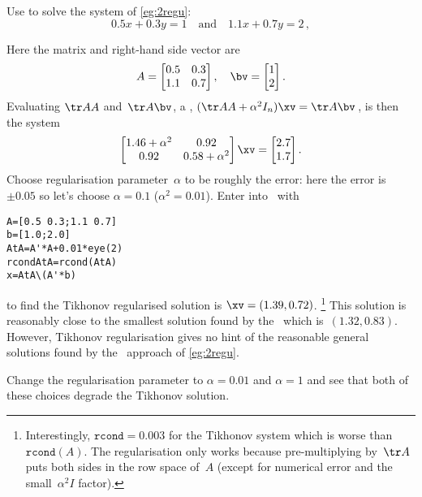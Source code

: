 \begin{example} \label{eg:}
Use  to solve the system of \autoref{eg:2regu}:
\begin{equation*}
0.5x+0.3y=1\quad\text{and}\quad 1.1x+0.7y=2\,,
\end{equation*}
\begin{solution} 
Here the matrix and right-hand side vector are
\begin{equation*}
A=\begin{bmatrix} 0.5&0.3\\1.1&0.7 \end{bmatrix},\quad
\bv=\begin{bmatrix} 1\\2 \end{bmatrix}.
\end{equation*}
Evaluating \(\tr AA\) and~\(\tr A\bv\), a , \((\tr AA+\alpha^2I_n)\xv=\tr A\bv\)\,, is then the system
\begin{equation*}
\begin{bmatrix} 1.46+\alpha^2&0.92\\0.92&0.58+\alpha^2 \end{bmatrix}\xv=\begin{bmatrix} 2.7\\1.7 \end{bmatrix}.
\end{equation*}
Choose regularisation parameter~\(\alpha\) to be roughly the error: here the error is~\(\pm0.05\) so let's choose \(\alpha=0.1\) (\(\alpha^2=0.01\)).
Enter into \script\ with
\begin{verbatim}
A=[0.5 0.3;1.1 0.7]
b=[1.0;2.0]
AtA=A'*A+0.01*eye(2)
rcondAtA=rcond(AtA)
x=AtA\(A'*b)
\end{verbatim}
\setbox\ajrqrbox\hbox{}%
\marginpar{\usebox{\ajrqrbox\\[2ex]}}%
to find the Tikhonov regularised solution is \(\xv=(1.39,0.72)\).%
\footnote{Interestingly, \(\texttt{rcond}=0.003\) for the Tikhonov system which is worse than \(\texttt{rcond}(A)\).  The regularisation only works because pre-multiplying by~\(\tr A\) puts both sides in the row space of~\(A\) (except for numerical error and the small~\(\alpha^2I\) factor).}
This solution is reasonably close to the smallest solution found by the \svd\ which is~\((1.32,0.83)\).
However, Tikhonov regularisation gives no hint of the reasonable general solutions found by the \svd\ approach of \autoref{eg:2regu}.

Change the regularisation parameter to \(\alpha=0.01\) and \(\alpha=1\) and see that both of these choices degrade the Tikhonov solution.
\end{solution}
\end{example}




